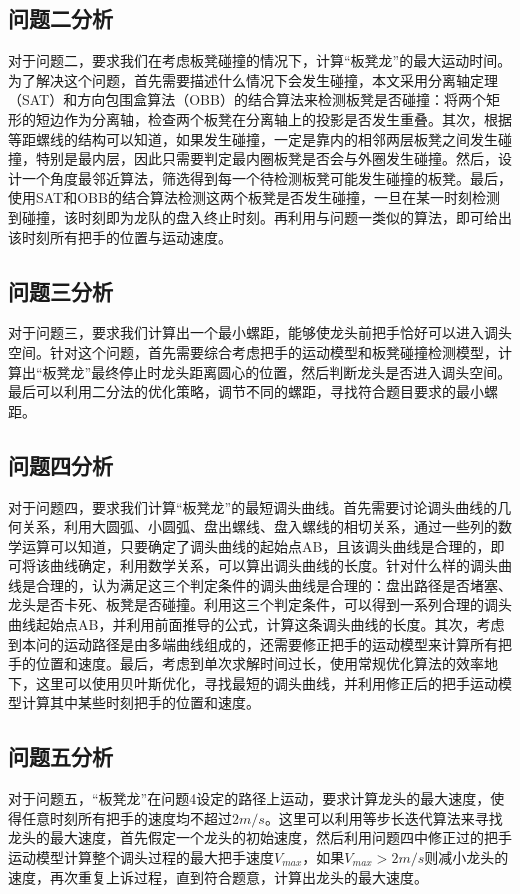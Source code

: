 \documentclass[withoutpreface,bwprint]{cumcmthesis}
\begin{document}
\subsection{问题二分析}
对于问题二，要求我们在考虑板凳碰撞的情况下，计算“板凳龙”的最大运动时间。为了解决这个问题，首先需要描述什么情况下会发生碰撞，本文采用分离轴定理（SAT）和方向包围盒算法（OBB）的结合算法来检测板凳是否碰撞：将两个矩形的短边作为分离轴，检查两个板凳在分离轴上的投影是否发生重叠。其次，根据等距螺线的结构可以知道，如果发生碰撞，一定是靠内的相邻两层板凳之间发生碰撞，特别是最内层，因此只需要判定最内圈板凳是否会与外圈发生碰撞。然后，设计一个角度最邻近算法，筛选得到每一个待检测板凳可能发生碰撞的板凳。最后，使用SAT和OBB的结合算法检测这两个板凳是否发生碰撞，一旦在某一时刻检测到碰撞，该时刻即为龙队的盘入终止时刻。再利用与问题一类似的算法，即可给出该时刻所有把手的位置与运动速度。

\subsection{问题三分析}
对于问题三，要求我们计算出一个最小螺距，能够使龙头前把手恰好可以进入调头空间。针对这个问题，首先需要综合考虑把手的运动模型和板凳碰撞检测模型，计算出“板凳龙”最终停止时龙头距离圆心的位置，然后判断龙头是否进入调头空间。最后可以利用二分法的优化策略，调节不同的螺距，寻找符合题目要求的最小螺距。

\subsection{问题四分析}
对于问题四，要求我们计算“板凳龙”的最短调头曲线。首先需要讨论调头曲线的几何关系，利用大圆弧、小圆弧、盘出螺线、盘入螺线的相切关系，通过一些列的数学运算可以知道，只要确定了调头曲线的起始点AB，且该调头曲线是合理的，即可将该曲线确定，利用数学关系，可以算出调头曲线的长度。针对什么样的调头曲线是合理的，认为满足这三个判定条件的调头曲线是合理的：盘出路径是否堵塞、龙头是否卡死、板凳是否碰撞。利用这三个判定条件，可以得到一系列合理的调头曲线起始点AB，并利用前面推导的公式，计算这条调头曲线的长度。其次，考虑到本问的运动路径是由多端曲线组成的，还需要修正把手的运动模型来计算所有把手的位置和速度。最后，考虑到单次求解时间过长，使用常规优化算法的效率地下，这里可以使用贝叶斯优化，寻找最短的调头曲线，并利用修正后的把手运动模型计算其中某些时刻把手的位置和速度。

\subsection{问题五分析}
对于问题五，“板凳龙”在问题4设定的路径上运动，要求计算龙头的最大速度，使得任意时刻所有把手的速度均不超过$2m/s$。这里可以利用等步长迭代算法来寻找龙头的最大速度，首先假定一个龙头的初始速度，然后利用问题四中修正过的把手运动模型计算整个调头过程的最大把手速度$V_{max}$，如果$V_{max} > 2m/s$则减小龙头的速度，再次重复上诉过程，直到符合题意，计算出龙头的最大速度。
\end{document}

